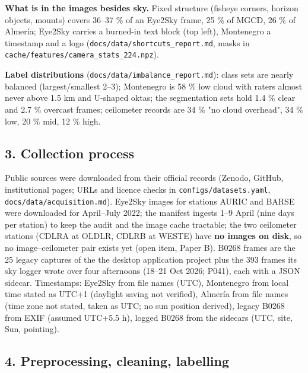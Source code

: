 \textbf{What is in the images besides sky.} Fixed structure (fisheye corners, horizon objects, mounts) covers 36–37 \% of an Eye2Sky frame, 25 \% of MGCD, 26 \% of Almería; Eye2Sky carries a burned-in text block (top left), Montenegro a timestamp and a logo (\texttt{docs/data/shortcuts\_\allowbreak{}report.md}, masks in \texttt{cache/features/camera\_\allowbreak{}stats\_\allowbreak{}224.npz}).

\textbf{Label distributions} (\texttt{docs/data/imbalance\_\allowbreak{}report.md}): class sets are nearly balanced (largest/smallest 2–3); Montenegro is 58 \% low cloud with raters almost never above 1.5 km and U-shaped oktas; the segmentation sets hold 1.4 \% clear and 2.7 \% overcast frames; ceilometer records are 34 \% "no cloud overhead", 34 \% low, 20 \% mid, 12 \% high.

\subsection{3. Collection process}

Public sources were downloaded from their official records (Zenodo, GitHub, institutional pages; URLs and licence checks in \texttt{configs/datasets.yaml}, \texttt{docs/data/acquisition.md}). Eye2Sky images for stations AURIC and BARSE were downloaded for April–July 2022; the manifest ingests 1–9 April (nine days per station) to keep the audit and the image cache tractable; the two ceilometer stations (CDLRA at OLDLR, CDLRB at WESTE) have \textbf{no images on disk}, so no image–ceilometer pair exists yet (open item, Paper B). B0268 frames are the 25 legacy captures of the the desktop application project plus the 393 frames its sky logger wrote over four afternoons (18–21 Oct 2026; P041), each with a JSON sidecar. Timestamps: Eye2Sky from file names (UTC), Montenegro from local time stated as UTC+1 (daylight saving not verified), Almería from file names (time zone not stated, taken as UTC; no sun position derived), legacy B0268 from EXIF (assumed UTC+5.5 h), logged B0268 from the sidecars (UTC, site, Sun, pointing).

\subsection{4. Preprocessing, cleaning, labelling}

